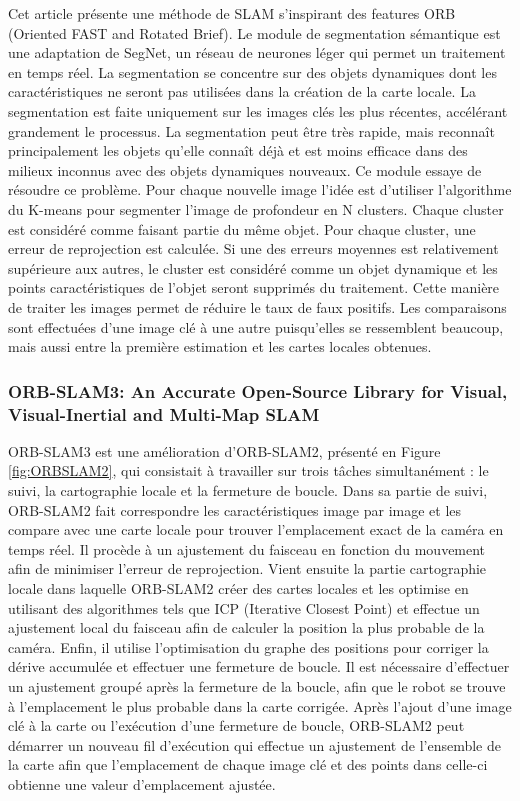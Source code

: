\documentclass[11pt]{article}
\begin{document}
  Cet article présente une méthode de SLAM s'inspirant des features ORB (Oriented FAST and Rotated Brief).
  Le module de segmentation sémantique est une adaptation de SegNet, un réseau de neurones léger qui permet un traitement en temps réel.
  La segmentation se concentre sur des objets dynamiques dont les caractéristiques ne seront pas utilisées dans la création de 
  la carte locale. La segmentation est faite uniquement sur les images clés les plus récentes, accélérant grandement le processus.
  La segmentation peut être très rapide, mais reconnaît principalement les objets qu'elle connaît déjà et est moins efficace dans des 
  milieux inconnus avec des objets dynamiques nouveaux. Ce module essaye de résoudre ce problème.
  Pour chaque nouvelle image l'idée est d'utiliser l'algorithme du K-means pour segmenter l'image de profondeur en N clusters.
  Chaque cluster est considéré comme faisant partie du même objet. Pour chaque cluster, une erreur de reprojection est calculée. Si une 
  des erreurs moyennes est relativement supérieure aux autres, le cluster est considéré comme un objet dynamique et les points caractéristiques
  de l'objet seront supprimés du traitement. Cette manière de traiter les images permet de réduire le taux de faux positifs. 
  Les comparaisons sont effectuées d'une image clé à une autre puisqu'elles se ressemblent beaucoup, mais aussi entre la première estimation
  et les cartes locales obtenues.

  \pagebreak

  \subsubsection{ORB-SLAM3: An Accurate Open-Source Library for Visual, Visual-Inertial and Multi-Map SLAM}

  ORB-SLAM3 est une amélioration d'ORB-SLAM2, présenté en Figure \ref{fig:ORBSLAM2}, qui consistait à travailler sur trois tâches simultanément : 
  le suivi, la cartographie locale et la fermeture de boucle. Dans sa partie de suivi, ORB-SLAM2 fait correspondre les caractéristiques image 
  par image et les compare avec une carte locale pour trouver l'emplacement exact de la caméra en temps réel. Il procède à un ajustement 
  du faisceau en fonction du mouvement afin de minimiser l'erreur de reprojection. Vient ensuite la partie cartographie locale 
  dans laquelle ORB-SLAM2 
  créer des cartes locales et les optimise en utilisant des algorithmes tels que ICP (Iterative Closest Point) et effectue un ajustement 
  local du faisceau afin de calculer la position la plus probable de la caméra. Enfin, il utilise l'optimisation du graphe des positions 
  pour corriger la dérive accumulée et effectuer une fermeture de boucle. Il est nécessaire d'effectuer un ajustement groupé
  après la fermeture de la boucle, afin que le robot se trouve à l'emplacement le plus probable dans la carte corrigée. 
  Après l'ajout d'une image clé à la carte ou l'exécution d'une fermeture de boucle, 
  ORB-SLAM2 peut démarrer un nouveau fil d'exécution qui effectue un ajustement de l'ensemble de la carte afin que 
  l'emplacement de chaque image clé et des points dans celle-ci obtienne une valeur d'emplacement ajustée.
\end{document}

